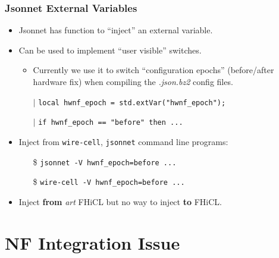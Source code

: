 \documentclass[xcolor=dvipsnames]{beamer}
\begin{document}
\begin{frame}
  \frametitle{Jsonnet External Variables}
  

  \begin{itemize}
  \item Jsonnet has function to ``inject'' an external variable.
  \item Can be used to implement  ``user visible'' switches.
    \begin{itemize}\scriptsize
    \item Currently we use it to switch ``configuration epochs''
      (before/after hardware fix) when compiling the
      \textit{.json.bz2} config files.
    \item[$|$] \texttt{local hwnf\_epoch = std.extVar("hwnf\_epoch");}
    \item[$|$] \texttt{if hwnf\_epoch == "before" then ...}
    \end{itemize}
  \item Inject from \texttt{wire-cell}, \texttt{jsonnet} command line programs:
    \begin{itemize}
    \item[ \$] \texttt{jsonnet -V hwnf\_epoch=before ...}
    \item[ \$] \texttt{wire-cell -V hwnf\_epoch=before ...}
    \end{itemize}
  \item Inject \textbf{from} \textit{art} FHiCL but no way to inject \textbf{to} FHiCL.
  \end{itemize}

\end{frame}

\section{NF Integration Issue}
\begin{frame}
\end{frame}
\end{document}

